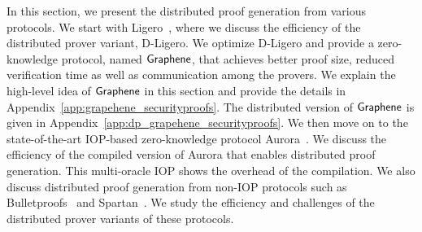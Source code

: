 In this section, we present the distributed proof generation from various protocols.  We start with Ligero~\cite{ligero}, where we discuss the efficiency of the distributed prover variant, D-Ligero. We optimize D-Ligero and provide a zero-knowledge protocol, named $\textsf{Graphene}$, that achieves better proof size, reduced verification time as well as communication among the provers. We explain the high-level idea of $\textsf{Graphene}$ in this section and provide the details in Appendix~\ref{app:grapehene_securityproofs}. The distributed version of $\textsf{Graphene}$ is given in Appendix~\ref{app:dp_grapehene_securityproofs}.
We then move on to the state-of-the-art IOP-based zero-knowledge protocol Aurora~\cite{aurora}. We discuss the efficiency of the compiled version of Aurora that enables distributed proof generation. This multi-oracle IOP shows the overhead of the compilation. 
We also discuss distributed proof generation from non-IOP protocols such as Bulletproofs~\cite{bulletproofs} and Spartan~\cite{spartan}. We study the efficiency and challenges of the distributed prover variants of these protocols. 




